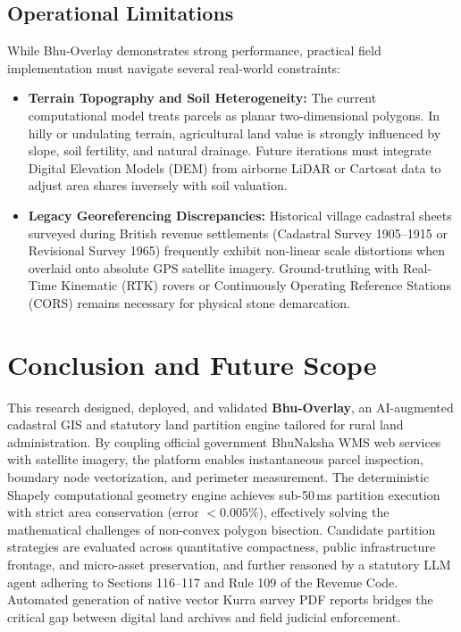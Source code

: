\documentclass[conference]{IEEEtran}
\begin{document}
\subsection{Operational Limitations}
While Bhu-Overlay demonstrates strong performance, practical field implementation must navigate several real-world constraints:
\begin{itemize}
    \item \textbf{Terrain Topography and Soil Heterogeneity:} The current computational model treats parcels as planar two-dimensional polygons. In hilly or undulating terrain, agricultural land value is strongly influenced by slope, soil fertility, and natural drainage. Future iterations must integrate Digital Elevation Models (DEM) from airborne LiDAR or Cartosat data to adjust area shares inversely with soil valuation.
    \item \textbf{Legacy Georeferencing Discrepancies:} Historical village cadastral sheets surveyed during British revenue settlements (Cadastral Survey 1905--1915 or Revisional Survey 1965) frequently exhibit non-linear scale distortions when overlaid onto absolute GPS satellite imagery. Ground-truthing with Real-Time Kinematic (RTK) rovers or Continuously Operating Reference Stations (CORS) remains necessary for physical stone demarcation.
\end{itemize}

\section{Conclusion and Future Scope}

This research designed, deployed, and validated \textbf{Bhu-Overlay}, an AI-augmented cadastral GIS and statutory land partition engine tailored for rural land administration. By coupling official government BhuNaksha WMS web services with satellite imagery, the platform enables instantaneous parcel inspection, boundary node vectorization, and perimeter measurement. The deterministic Shapely computational geometry engine achieves sub-50\,ms partition execution with strict area conservation (error $< 0.005\%$), effectively solving the mathematical challenges of non-convex polygon bisection. Candidate partition strategies are evaluated across quantitative compactness, public infrastructure frontage, and micro-asset preservation, and further reasoned by a statutory LLM agent adhering to Sections 116--117 and Rule 109 of the Revenue Code. Automated generation of native vector Kurra survey PDF reports bridges the critical gap between digital land archives and field judicial enforcement.
\end{document}
